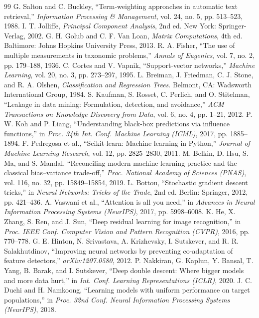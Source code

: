\documentclass[12pt,a4paper]{report}
\begin{document}
\begin{thebibliography}{99}
 G. Salton and C. Buckley, ``Term-weighting approaches in automatic text retrieval,'' \textit{Information Processing \& Management}, vol. 24, no. 5, pp. 513--523, 1988.
 I. T. Jolliffe, \textit{Principal Component Analysis}, 2nd ed. New York: Springer-Verlag, 2002.
 G. H. Golub and C. F. Van Loan, \textit{Matrix Computations}, 4th ed. Baltimore: Johns Hopkins University Press, 2013.
 R. A. Fisher, ``The use of multiple measurements in taxonomic problems,'' \textit{Annals of Eugenics}, vol. 7, no. 2, pp. 179--188, 1936.
 C. Cortes and V. Vapnik, ``Support-vector networks,'' \textit{Machine Learning}, vol. 20, no. 3, pp. 273--297, 1995.
 L. Breiman, J. Friedman, C. J. Stone, and R. A. Olshen, \textit{Classification and Regression Trees}. Belmont, CA: Wadsworth International Group, 1984.
 S. Kaufman, S. Rosset, C. Perlich, and O. Stitelman, ``Leakage in data mining: Formulation, detection, and avoidance,'' \textit{ACM Transactions on Knowledge Discovery from Data}, vol. 6, no. 4, pp. 1--21, 2012.
 P. W. Koh and P. Liang, ``Understanding black-box predictions via influence functions,'' in \textit{Proc. 34th Int. Conf. Machine Learning (ICML)}, 2017, pp. 1885--1894.
 F. Pedregosa et al., ``Scikit-learn: Machine learning in Python,'' \textit{Journal of Machine Learning Research}, vol. 12, pp. 2825--2830, 2011.
 M. Belkin, D. Hsu, S. Ma, and S. Mandal, ``Reconciling modern machine-learning practice and the classical bias--variance trade-off,'' \textit{Proc. National Academy of Sciences (PNAS)}, vol. 116, no. 32, pp. 15849--15854, 2019.
 L. Bottou, ``Stochastic gradient descent tricks,'' in \textit{Neural Networks: Tricks of the Trade}, 2nd ed. Berlin: Springer, 2012, pp. 421--436.
 A. Vaswani et al., ``Attention is all you need,'' in \textit{Advances in Neural Information Processing Systems (NeurIPS)}, 2017, pp. 5998--6008.
 K. He, X. Zhang, S. Ren, and J. Sun, ``Deep residual learning for image recognition,'' in \textit{Proc. IEEE Conf. Computer Vision and Pattern Recognition (CVPR)}, 2016, pp. 770--778.
 G. E. Hinton, N. Srivastava, A. Krizhevsky, I. Sutskever, and R. R. Salakhutdinov, ``Improving neural networks by preventing co-adaptation of feature detectors,'' \textit{arXiv:1207.0580}, 2012.
 P. Nakkiran, G. Kaplun, Y. Bansal, T. Yang, B. Barak, and I. Sutskever, ``Deep double descent: Where bigger models and more data hurt,'' in \textit{Int. Conf. Learning Representations (ICLR)}, 2020.
 J. C. Duchi and H. Namkoong, ``Learning models with uniform performance on target populations,'' in \textit{Proc. 32nd Conf. Neural Information Processing Systems (NeurIPS)}, 2018.
\end{thebibliography}
\end{document}
